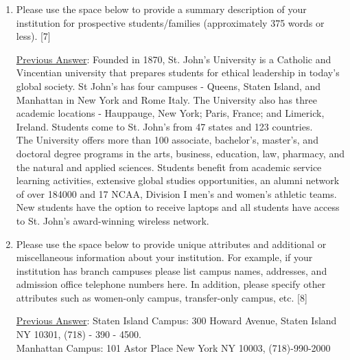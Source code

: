 \documentclass[12 pt, a4paper]{article}
\begin{document}
\begin{Form}
\begin{enumerate}\item Please use the space below to provide a summary description of your institution for prospective students/families (approximately 375 words or less). [7] \medskip

\underline{Previous Answer}: Founded in 1870, St. John's University is a Catholic and Vincentian university that prepares students for ethical leadership in today's global society. St John's has four campuses - Queens, Staten Island, and Manhattan in New York and Rome Italy. The University also has three academic locations - Hauppauge, New York; Paris, France; and Limerick, Ireland. Students come to St. John's from 47 states and 123 countries. \\

The University offers more than 100 associate, bachelor's, master's, and doctoral degree programs in the arts, business, education, law, pharmacy, and the natural and applied sciences. Students benefit from academic service learning activities, extensive global studies opportunities, an alumni network of over 184000 and 17 NCAA, Division I men's and women's athletic teams. New students have the option to receive laptops and all students have access to St. John's award-winning wireless network.\medskip

\TextField[width = 6 in,multiline, name=90010]{} \medskip

\item Please use the space below to provide unique attributes and additional or miscellaneous information about your institution.  For example, if your institution has branch campuses please list campus names, addresses, and admission office telephone numbers here.  In addition, please specify other attributes such as women-only campus, transfer-only campus, etc. [8] \medskip

\underline{Previous Answer}: Staten Island Campus: 300 Howard Avenue, Staten Island NY 10301, (718) - 390 - 4500. \\
Manhattan Campus: 101 Astor Place New York NY 10003, (718)-990-2000\medskip

\TextField[width = 6 in,multiline, name=90011]{} \medskip

\end{enumerate}
\newpage
\end{Form}
\end{document}
